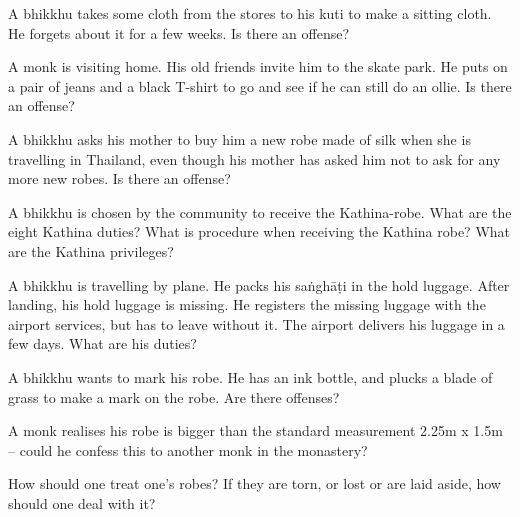 \bigskip

A bhikkhu takes some cloth from the stores to his kuti to make a sitting cloth. He
forgets about it for a few weeks. Is there an offense?

\bigskip

A monk is visiting home. His old friends invite him to the skate park. He puts
on a pair of jeans and a black T-shirt to go and see if he can still do an
ollie. Is there an offense?

\bigskip

A bhikkhu asks his mother to buy him a new robe made of silk when she is travelling in Thailand,
even though his mother has asked him not to ask for any more new robes. Is there an offense?

\bigskip

A bhikkhu is chosen by the community to receive the Kathina-robe. What are the
eight Kathina duties? What is procedure when receiving the Kathina robe? What
are the Kathina privileges?

\bigskip

A bhikkhu is travelling by plane. He packs his saṅghāṭi in the hold luggage. After
landing, his hold luggage is missing. He registers the missing luggage with the
airport services, but has to leave without it. The airport delivers his luggage
in a few days. What are his duties?

\bigskip

A bhikkhu wants to mark his robe. He has an ink bottle, and plucks a blade of
grass to make a mark on the robe. Are there offenses?

\bigskip

A monk realises his robe is bigger than the standard measurement 2.25m x 1.5m –
could he confess this to another monk in the monastery?

\bigskip

How should one treat one's robes? If they are torn, or lost or are laid aside, how should one deal with it?
